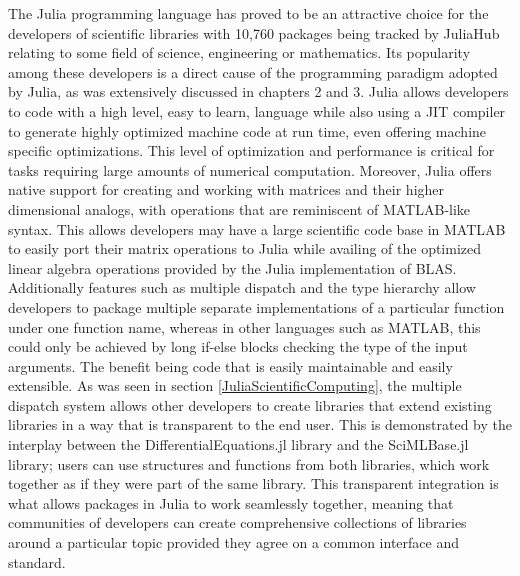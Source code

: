 The Julia programming language has proved to be an attractive choice for the developers of scientific libraries with
10,760 packages being tracked by JuliaHub relating to some field of science, engineering or mathematics. Its popularity
among these developers is a direct cause of the programming paradigm adopted by Julia, as was extensively discussed in
chapters 2 and 3. Julia allows developers to code with a high level, easy to learn, language while also using a JIT
compiler to generate highly optimized machine code at run time, even offering machine specific optimizations. This level
of optimization and performance is critical for tasks requiring large amounts of numerical computation. Moreover, Julia
offers native support for creating and working with matrices and their higher dimensional analogs, with operations that
are reminiscent of MATLAB-like syntax. This allows developers may have a large scientific code base in MATLAB to easily
port their matrix operations to Julia while availing of the optimized linear algebra operations provided by the Julia
implementation of BLAS. Additionally features such as multiple dispatch and the type hierarchy allow developers to
package multiple separate implementations of a particular function under one function name, whereas in other languages
such as MATLAB, this could only be achieved by long if-else blocks checking the type of the input arguments. The benefit
being code that is easily maintainable and easily extensible. As was seen in section \ref{JuliaScientificComputing}, the
multiple dispatch system allows other developers to create libraries that extend existing libraries in a way that is
transparent to the end user. This is demonstrated by the interplay between the DifferentialEquations.jl library and the
SciMLBase.jl library; users can use structures and functions from both libraries, which work together as if they were
part of the same library. This transparent integration is what allows packages in Julia to work seamlessly together,
meaning that communities of developers can create comprehensive collections of libraries around a particular topic
provided they agree on a common interface and standard.